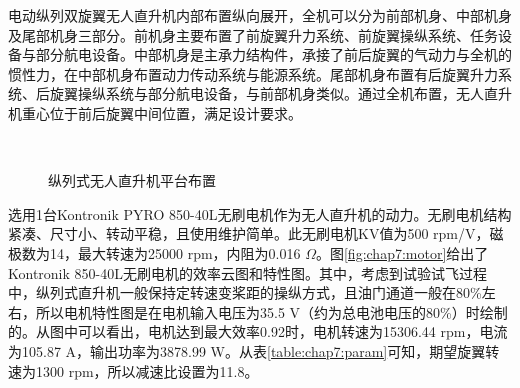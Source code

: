 电动纵列双旋翼无人直升机内部布置纵向展开，全机可以分为前部机身、中部机身及尾部机身三部分。前机身主要布置了前旋翼升力系统、前旋翼操纵系统、任务设备与部分航电设备。中部机身是主承力结构件，承接了前后旋翼的气动力与全机的惯性力，在中部机身布置动力传动系统与能源系统。尾部机身布置有后旋翼升力系统、后旋翼操纵系统与部分航电设备，与前部机身类似。通过全机布置，无人直升机重心位于前后旋翼中间位置，满足设计要求。
\begin{figure}[htb!]
    \centering
    \\
    \quad
    \caption{纵列式无人直升机平台布置\label{fig:chap7:layout}}
\end{figure}

选用1台Kontronik PYRO 850-40L无刷电机作为无人直升机的动力。无刷电机结构紧凑、尺寸小、转动平稳，且使用维护简单。此无刷电机KV值为500 rpm/V，磁极数为14，最大转速为25000 rpm，内阻为0.016 $\Omega$。图\ref{fig:chap7:motor}给出了Kontronik 850-40L无刷电机的效率云图和特性图。其中，考虑到试验试飞过程中，纵列式直升机一般保持定转速变桨距的操纵方式，且油门通道一般在80\%左右，所以电机特性图是在电机输入电压为35.5 V（约为总电池电压的80\%）时绘制的。从图中可以看出，电机达到最大效率0.92时，电机转速为15306.44 rpm，电流为105.87 A，输出功率为3878.99 W。从表\ref{table:chap7:param}可知，期望旋翼转速为1300 rpm，所以减速比设置为11.8。

